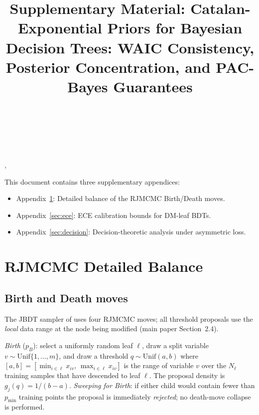 \documentclass[ba,preprint]{imsart}
\theoremstyle{plain}
\theoremstyle{remark}
\begin{document}
\begin{frontmatter}
\title{Supplementary Material: Catalan-Exponential Priors for Bayesian Decision Trees:
       WAIC Consistency, Posterior Concentration, and PAC-Bayes Guarantees}
\begin{aug}
\author[A]{~},
\author[A]{~}
\address[A]{School of Computing and Engineering,
            University of Bedfordshire, Luton, UK%
            }
\end{aug}
\end{frontmatter}

This document contains three supplementary appendices:
\begin{itemize}
  \item Appendix~\ref{sec:rjmcmc}: Detailed balance of the RJMCMC Birth/Death moves.
  \item Appendix~\ref{sec:ece}: ECE calibration bounds for DM-leaf BDTs.
  \item Appendix~\ref{sec:decision}: Decision-theoretic analysis under asymmetric loss.
\end{itemize}

\section{RJMCMC Detailed Balance}
\label{sec:rjmcmc}

\subsection{Birth and Death moves}

The JBDT sampler of \citet{schetinin2025} uses four RJMCMC \citep{green1995}
moves; all threshold proposals use the \emph{local} data range at the
node being modified (main paper Section~2.4).

\emph{Birth} ($p_B$): select a uniformly random leaf $\ell$, draw a split
variable $v \sim \mathrm{Unif}\{1,\ldots,m\}$, and draw a threshold
$q \sim \mathrm{Unif}(a,b)$ where $[a,b] = [\min_{i\in\ell} x_{iv},\,
\max_{i\in\ell} x_{iv}]$ is the range of variable $v$ over the $N_\ell$
training samples that have descended to leaf $\ell$.
The proposal density is $g_j(q) = 1/(b-a)$.
\emph{Sweeping for Birth}: if either child would contain fewer than $p_{\min}$
training points the proposal is immediately \emph{rejected}; no
death-move collapse is performed.
\end{document}
